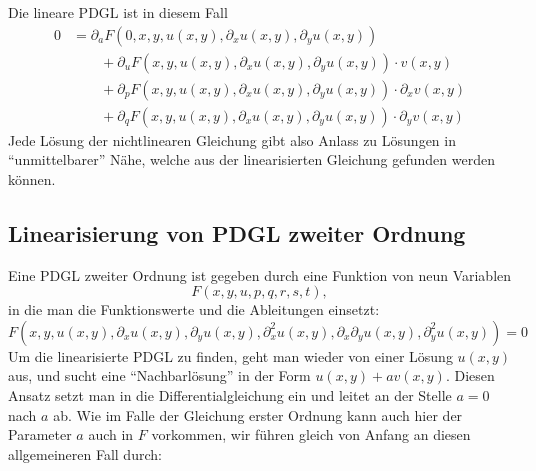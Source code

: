 Die lineare PDGL ist in diesem Fall
\begin{align*}
0
&=
\partial_aF(0,x,y,u(x,y),\partial_xu(x,y),\partial_yu(x,y))
\\
&\qquad
+
\partial_uF(x,y,u(x,y),\partial_xu(x,y),\partial_yu(x,y))\cdot v(x,y)
\\
&\qquad
+
\partial_pF(x,y,u(x,y),\partial_xu(x,y),\partial_yu(x,y))\cdot \partial_xv(x,y)
\\
&\qquad
+
\partial_qF(x,y,u(x,y),\partial_xu(x,y),\partial_yu(x,y))\cdot \partial_yv(x,y)
\end{align*}
Jede Lösung der nichtlinearen Gleichung gibt also Anlass zu Lösungen
in ``unmittelbarer'' Nähe, welche aus der linearisierten Gleichung
gefunden werden können.

\subsection{Linearisierung von PDGL zweiter Ordnung}
Eine PDGL zweiter Ordnung ist gegeben durch eine Funktion von neun
Variablen
\[
F(x,y,u,p,q,r,s,t),
\]
in die man die Funktionswerte und die Ableitungen einsetzt:
\[
F(x,y,u(x,y), \partial_xu(x,y),\partial_yu(x,y),
\partial_x^2u(x,y),
\partial_x\partial_yu(x,y),
\partial_y^2u(x,y))
=0
\]
Um die linearisierte PDGL zu finden, geht man wieder von einer
Lösung $u(x,y)$ aus, und sucht eine ``Nachbarlösung'' in der
Form $u(x,y)+av(x,y)$. Diesen Ansatz setzt man in die 
Differentialgleichung ein und leitet an der Stelle $a=0$
nach $a$ ab. Wie im Falle der Gleichung erster Ordnung kann auch
hier der Parameter $a$ auch in $F$ vorkommen, wir führen gleich
von Anfang an diesen allgemeineren Fall  durch:

